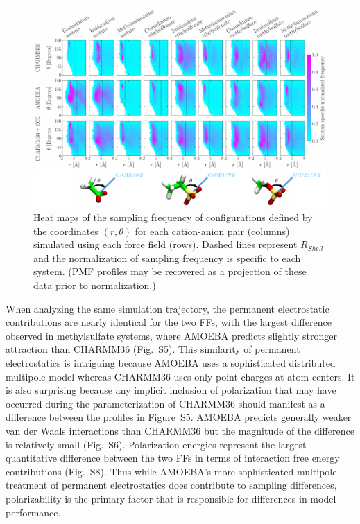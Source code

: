 \documentclass[journal=jpclcd,manuscript=article,articletitle=true,layout=twocolumn]{achemso}
\begin{document}
\begin{figure}[ht]
\begin{center}
    \includegraphics[width=\textwidth]{CEX/final_images/Figure3.pdf}
    \caption{Heat maps of the sampling frequency of configurations defined by the coordinates $(r, \theta)$ for each cation-anion pair (columns) simulated using each force field (rows). Dashed lines represent $R_{Shell}$ and the normalization of sampling frequency is specific to each system. (PMF profiles may be recovered as a projection of these data prior to normalization.)}
    \label{fig:heatmaps_theta_r}
\end{center}
\end{figure}

When analyzing the same simulation trajectory, the permanent electrostatic contributions are nearly identical for the two FFs, with the largest difference observed in methylsulfate systems, where AMOEBA predicts slightly stronger attraction than CHARMM36 (Fig.~S5). This similarity of permanent electrostatics is intriguing because AMOEBA uses a sophisticated distributed multipole model whereas CHARMM36 uses only point charges at atom centers.\cite{Huang2013, Shi2013} It is also surprising because any implicit inclusion of polarization that may have occurred during the parameterization of CHARMM36 should manifest as a difference between the profiles in Figure~S5. AMOEBA predicts generally weaker van der Waals interactions than CHARMM36 but the magnitude of the difference is relatively small (Fig.~S6). Polarization energies represent the largest quantitative difference between the two FFs in terms of interaction free energy contributions (Fig.~S8). Thus while AMOEBA's more sophisticated multipole treatment of permanent electrostatics does contribute to sampling differences,\cite{Shi2013} polarizability is the primary factor that is responsible for differences in model performance. 
\end{document}
